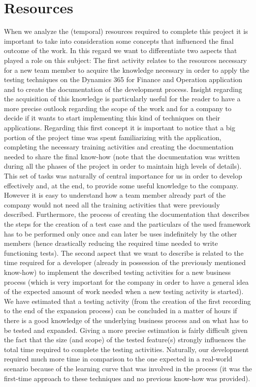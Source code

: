 \section{Resources} 

When we analyze the (temporal) resources required to complete this project it is important to take into consideration some concepts that influenced the final outcome of the work. In this regard we want to differentiate two aspects that played a role on this subject: 
The first activity relates to the resources necessary for a new team member to acquire the knowledge necessary in order to apply the testing techniques on the Dynamics 365 for Finance and Operation application and to create the documentation of the development process. Insight regarding the acquisition of this knowledge is particularly useful for the reader to have a more precise outlook regarding the scope of the work and for a company to decide if it wants to start implementing this kind of techniques on their applications. Regarding this first concept it is important to notice that a big portion of the project time was spent familiarizing with the application, completing the necessary training activities and creating the documentation needed to share the final know-how (note that the documentation was written during all the phases of the project in order to maintain high levels of details). This set of tasks was naturally of central importance for us in order to develop effectively and, at the end, to provide some useful knowledge to the company. However it is easy to understand how a team member already part of the company would not need all the training activities that were previously described. Furthermore, the process of creating the documentation that describes the steps for the creation of a test case and the particulars of the used framework has to be performed only once and can later be uses indefinitely by the other members (hence drastically reducing the required time needed to write functioning tests).
The second aspect that we want to describe is related to the time required for a developer (already in possession of the previously mentioned know-how) to implement the described testing activities for a new business process (which is very important for the company in order to have a general idea of the expected amount of work needed when a new testing activity is started). We have estimated that a testing activity (from the creation of the first recording to the end of the expansion process) can be concluded in a matter of hours if there is a good knowledge of the underlying business process and on what has to be tested and expanded. Giving a more precise estimation is fairly difficult given the fact that the size (and scope) of the tested feature(s) strongly influences the total time required to complete the testing activities. Naturally, our development required much more time in comparison to the one expected in a real-world scenario because of the learning curve that was involved in the process (it was the first-time approach to these techniques and no previous know-how was provided).

